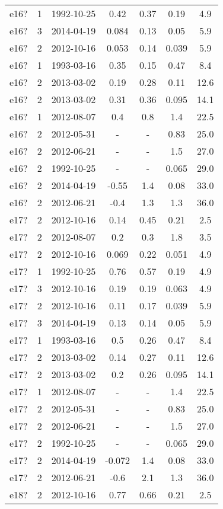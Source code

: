 \begin{table*}[htp]
\begin{tabular}{ccccccc}
e16? & 1 & 1992-10-25 & 0.42 & 0.37 & 0.19 & 4.9 \\
e16? & 3 & 2014-04-19 & 0.084 & 0.13 & 0.05 & 5.9 \\
e16? & 2 & 2012-10-16 & 0.053 & 0.14 & 0.039 & 5.9 \\
e16? & 1 & 1993-03-16 & 0.35 & 0.15 & 0.47 & 8.4 \\
e16? & 2 & 2013-03-02 & 0.19 & 0.28 & 0.11 & 12.6 \\
e16? & 2 & 2013-03-02 & 0.31 & 0.36 & 0.095 & 14.1 \\
e16? & 1 & 2012-08-07 & 0.4 & 0.8 & 1.4 & 22.5 \\
e16? & 2 & 2012-05-31 & - & - & 0.83 & 25.0 \\
e16? & 2 & 2012-06-21 & - & - & 1.5 & 27.0 \\
e16? & 2 & 1992-10-25 & - & - & 0.065 & 29.0 \\
e16? & 2 & 2014-04-19 & -0.55 & 1.4 & 0.08 & 33.0 \\
e16? & 2 & 2012-06-21 & -0.4 & 1.3 & 1.3 & 36.0 \\
e17? & 2 & 2012-10-16 & 0.14 & 0.45 & 0.21 & 2.5 \\
e17? & 2 & 2012-08-07 & 0.2 & 0.3 & 1.8 & 3.5 \\
e17? & 2 & 2012-10-16 & 0.069 & 0.22 & 0.051 & 4.9 \\
e17? & 1 & 1992-10-25 & 0.76 & 0.57 & 0.19 & 4.9 \\
e17? & 3 & 2012-10-16 & 0.19 & 0.19 & 0.063 & 4.9 \\
e17? & 2 & 2012-10-16 & 0.11 & 0.17 & 0.039 & 5.9 \\
e17? & 3 & 2014-04-19 & 0.13 & 0.14 & 0.05 & 5.9 \\
e17? & 1 & 1993-03-16 & 0.5 & 0.26 & 0.47 & 8.4 \\
e17? & 2 & 2013-03-02 & 0.14 & 0.27 & 0.11 & 12.6 \\
e17? & 2 & 2013-03-02 & 0.2 & 0.26 & 0.095 & 14.1 \\
e17? & 1 & 2012-08-07 & - & - & 1.4 & 22.5 \\
e17? & 2 & 2012-05-31 & - & - & 0.83 & 25.0 \\
e17? & 2 & 2012-06-21 & - & - & 1.5 & 27.0 \\
e17? & 2 & 1992-10-25 & - & - & 0.065 & 29.0 \\
e17? & 2 & 2014-04-19 & -0.072 & 1.4 & 0.08 & 33.0 \\
e17? & 2 & 2012-06-21 & -0.6 & 2.1 & 1.3 & 36.0 \\
e18? & 2 & 2012-10-16 & 0.77 & 0.66 & 0.21 & 2.5 \\

\end{tabular}
\end{table*}
